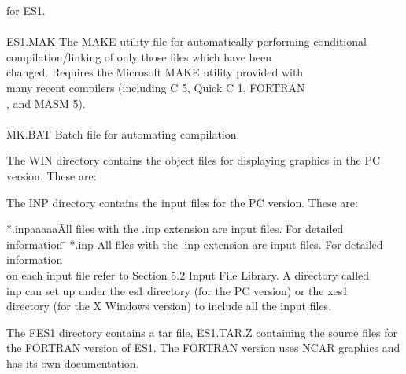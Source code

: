\begin{section}
\begin{subsection}
\begin{tabbing}
		     \> for ES1. 								\\
												\\
        ES1.MAK      \> The MAKE utility file for automatically performing conditional 	\> 	\\
		     \> compilation/linking of only those files which have been 	\> 	\\
		     \> changed.  Requires the Microsoft MAKE utility provided with 	\> 	\\
		     \> many recent compilers (including C 5, Quick C 1, FORTRAN 	\> 	\\
		     , and MASM 5). 							\\
												\\
        MK.BAT       \>   Batch file for automating compilation.			\>
\end{tabbing}
\noindent
   The WIN directory contains the object files for displaying graphics in the
   PC version.  These are:

\newpage
\noindent
   The INP directory contains the input files for the PC version.  These are:
\begin{tabbing}
        *.inpaaaaa\=  All files with the .inp extension are input files.
For detailed information \= \kill 
        *.inp  \>  All files with the .inp extension are input files. For detailed information \> \\
	       \> on each input file refer to Section 5.2 Input File Library.  A directory called \> \\
		\> inp can set up under the es1 directory (for the PC version) or the xes1 \> \\
		\> directory (for the X Windows version) to include all the input files. \> 
\end{tabbing}
\noindent
   The FES1 directory contains a tar file, ES1.TAR.Z containing the source files
   for the FORTRAN version of ES1.  The FORTRAN version uses NCAR graphics and
   has its own documentation.
\vspace{.2in}


\end{subsection}
\end{section}
